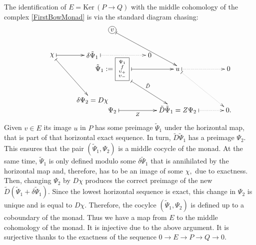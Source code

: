 \documentclass[12pt]{article}
\theoremstyle{definition}
\theoremstyle{remark}
\numberwithin{theorem}{section}
\begin{document}
The identification of $E =\mathrm{Ker}\, (P\rightarrow Q)$ with the middle cohomology of the complex \eqref{FirstBowMonad} is via the standard  diagram chasing:
\begin{align}\label{chasing-monad}
\xymatrix @C=3pc{
&&*+[o][F-]{v} %
\ar@{|->}[]!<0.5ex,-.5ex>;[dr]!<0ex,.5ex>+(-.5,1)\\
&
{ }\POS p+(-5,7) *+{\chi}="chi"%
\phantom{\begin{matrix} L\\W\\ e\\ e\end{matrix}}
& \tilde{\Psi}_1:=\boxed{\begin{smallmatrix} \Psi_1%
\\f%
\\ \upsilon_+%
\\ \upsilon_-%
\end{smallmatrix}}
\ar@{|->}[r]
\ar@{|->}[dr]^{\tilde{D}}%
\POS p+(-10,7) *+{\delta\tilde{\Psi}_1}="deltaPsi1" 
\ar@{|.>}[r]+(-16,7)
& u%
\ar@{|..>}[r]
\ar@{|..>}[dr] 
\POS p+(-14,7) *+{0}="uzero" 
& 0\\
&%
& \Psi_2 %
\ar@{|->}[r]_-{Z}
\POS p+(-10,5) *+{\delta\Psi_2=D\chi}="deltaPsi2" 
& \tilde{D}\tilde{\Psi}_1=Z\Psi_2%
\ar@{|..>}[r]
&0.%
\ar@{|->} "chi";"deltaPsi1"
\ar@{|->} "chi";"deltaPsi2"
}
\end{align}
Given $v\in E$ its image $u$ in $P$ has some preimage $\tilde{\Psi}_1$ under the horizontal map, that is part of that horizontal exact sequence. In turn, $\tilde{D}\tilde{\Psi}_1$ has a preimage $\Psi_2.$ This ensures that the pair $(\tilde{\Psi}_1,\Psi_2)$ is a middle cocycle of the monad.  At the same time, $\tilde{\Psi}_1$ is only defined modulo some $\delta \tilde{\Psi}_1$ that is annihilated by the horizontal map and, therefore, has to be an image of some $\chi,$ due to exactness. Then, changing  $\Psi_2$  by $D\chi$ produces the correct preimage of the new $\tilde{D}(\tilde{\Psi}_1+\delta \tilde{\Psi}_1).$  Since the lowest horizontal sequence is exact, this change in $\Psi_2$ is unique and is equal to $D\chi.$  Therefore, the cocylce $(\tilde{\Psi}_1,\Psi_2)$ is defined up to a coboundary of the monad.  Thus we have a map from $E$ to the middle cohomology of the monad.  It is injective due to the above argument.  It is surjective thanks to the exactness of the sequence $0\rightarrow E\rightarrow P\rightarrow Q\rightarrow 0.$
\end{document}
